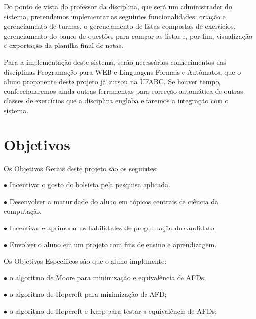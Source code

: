 \documentclass[
	12pt,				%
	openany,
	oneside,
	a4paper,			%
	english,			%
	brazil,				%
	]{abntex2}
\begin{document}
Do ponto de vista do professor da disciplina, que será um administrador do sistema, pretendemos implementar as seguintes funcionalidades: criação e gerenciamento de turmas, o gerenciamento de listas compostas de exercícios, gerenciamento do banco de questões para compor as listas e, por fim, visualização e exportação da planilha final de notas. 

Para a implementação deste sistema, serão necessários conhecimentos das disciplinas Programação para WEB e Linguagens Formais e Autômatos, que o aluno proponente deste projeto já cursou na UFABC. Se houver tempo, confeccionaremos ainda outras ferramentas para correção automática de outras classes de exercícios que a disciplina engloba e faremos a integração com o sistema. 



\chapter {Objetivos}


Os Objetivos Gerais deste projeto são os seguintes:

\begin{alineas}
	\item[$\bullet$] Incentivar o gosto do bolsista pela pesquisa aplicada.
	\item[$\bullet$] Desenvolver a maturidade do aluno em tópicos centrais de ciência da computação.
	\item[$\bullet$] Incentivar e aprimorar as habilidades de programação do candidato.
	\item[$\bullet$] Envolver o aluno em um projeto com fins de ensino e aprendizagem.
\end{alineas}


Os Objetivos Específicos são que o aluno implemente:

\begin{alineas}
	\item[$\bullet$] o algoritmo de Moore para minimização e equivalência de AFDs;
	\item[$\bullet$] o algoritmo de Hopcroft para minimização de AFD;
	\item[$\bullet$] o algoritmo de Hopcroft e Karp para testar a equivalência de AFDs;
\end{alineas}
\end{document}
